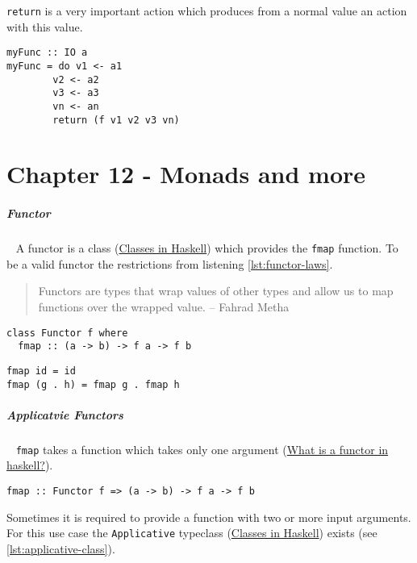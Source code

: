 \documentclass[11pt,twoside,landscape]{article}
\begin{document}
\begin{multicols}{3}
\texttt{return} is a very important action which produces from a normal value an action with this value.

\lstset{language=haskell,label= ,caption= ,captionpos=b,numbers=none}
\begin{lstlisting}
myFunc :: IO a
myFunc = do v1 <- a1
	    v2 <- a2
	    v3 <- a3
	    vn <- an
	    return (f v1 v2 v3 vn)
\end{lstlisting}

\section{Chapter 12 - Monads and more}
\label{sec:org00c2d90}
\subparagraph{Functor} \
\label{sec:org2241332}
A functor is a class (\href{../../../roam/20220217095852-classes_in_haskell.org}{Classes in Haskell}) which provides the \texttt{fmap} function.
To be a valid functor the restrictions from listening \ref{lst:functor-laws}.

\begin{quote}
Functors are types that wrap values of other types
and allow us to map functions over the wrapped value. -- Fahrad Metha
\end{quote}

\lstset{language=haskell,label= ,caption= ,captionpos=b,numbers=none}
\begin{lstlisting}
class Functor f where
  fmap :: (a -> b) -> f a -> f b
\end{lstlisting}

\begin{lstlisting}
fmap id = id
fmap (g . h) = fmap g . fmap h
\end{lstlisting}

\subparagraph{Applicatvie Functors} \
\label{sec:orgffcd899}
\texttt{fmap} takes a function which takes only one argument (\href{../../../roam/20220508104313-what_is_a_functor_in_haskell.org}{What is a functor in haskell?}).
\lstset{language=haskell,label= ,caption= ,captionpos=b,numbers=none}
\begin{lstlisting}
fmap :: Functor f => (a -> b) -> f a -> f b
\end{lstlisting}

Sometimes it is required to provide a function with two or more input arguments.
For this use case the \texttt{Applicative} typeclass (\href{../../../roam/20220217095852-classes_in_haskell.org}{Classes in Haskell}) exists (see \ref{lst:applicative-class}).


\end{multicols}
\end{document}

